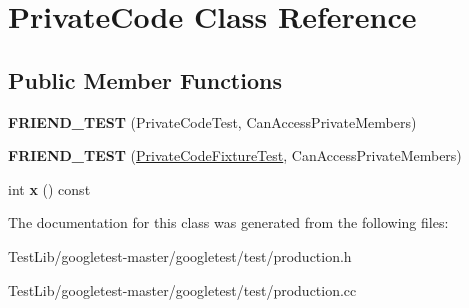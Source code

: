 \hypertarget{classPrivateCode}{}\section{Private\+Code Class Reference}
\label{classPrivateCode}
\subsection*{Public Member Functions}
\begin{DoxyCompactItemize}
\item 
\mbox{\label{classPrivateCode_a9a74a333501232539ab1636f0928d8f2}} 
{\bfseries F\+R\+I\+E\+N\+D\+\_\+\+T\+E\+ST} (Private\+Code\+Test, Can\+Access\+Private\+Members)
\item 
\mbox{\label{classPrivateCode_a29b6823300f68d78691476eeeaed8a7c}} 
{\bfseries F\+R\+I\+E\+N\+D\+\_\+\+T\+E\+ST} (\hyperlink{classtesting_1_1Test}{Private\+Code\+Fixture\+Test}, Can\+Access\+Private\+Members)
\item 
\mbox{\label{classPrivateCode_a247781246ce4d0c66563eaa39ba5aaa9}} 
int {\bfseries x} () const
\end{DoxyCompactItemize}


The documentation for this class was generated from the following files\+:\begin{DoxyCompactItemize}
\item 
Test\+Lib/googletest-\/master/googletest/test/production.\+h\item 
Test\+Lib/googletest-\/master/googletest/test/production.\+cc\end{DoxyCompactItemize}
